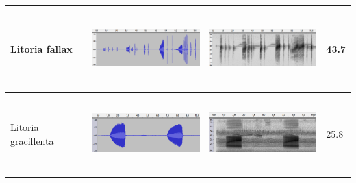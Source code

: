 \begin{table}[htb!]
\begin{tabular}{llll}
Litoria fallax      &      \begin{minipage}{.3\textwidth} \includegraphics[width=45mm, height=30mm]{image/Ch1/fallax_wav.png} \end{minipage}   &   \begin{minipage}{.3\textwidth} \includegraphics[width=45mm, height=30mm]{image/Ch1/fallax_spec.png}   \end{minipage}       & 43.7  \\ \hline
Litoria gracillenta &     \begin{minipage}{.3\textwidth} \includegraphics[width=45mm, height=30mm]{image/Ch1/graci_wav.png}  \end{minipage}   &    \begin{minipage}{.3\textwidth} \includegraphics[width=45mm, height=30mm]{image/Ch1/graci_spec.png}     \end{minipage}    & 25.8  \\ \hline

\end{tabular}
\end{table}
